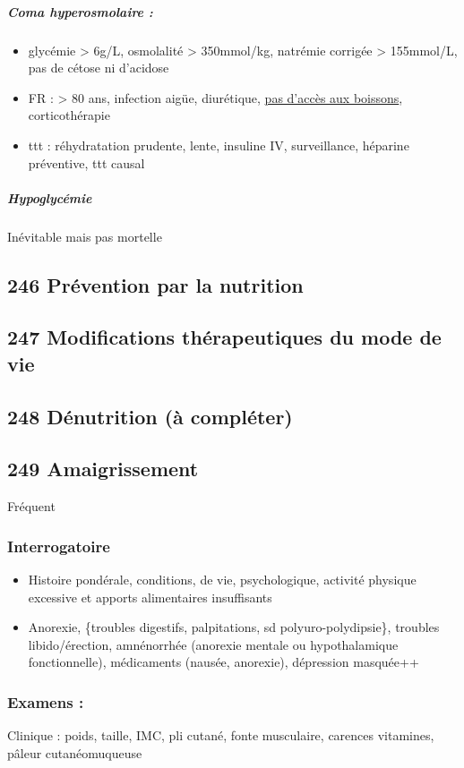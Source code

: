 \documentclass[11pt]{article}
\begin{document}
\subparagraph{Coma hyperosmolaire :}
\label{sec:org894731c}
\begin{itemize}
\item glycémie > 6g/L, osmolalité > 350mmol/kg, natrémie corrigée > 155mmol/L, pas
de cétose ni d'acidose
\item FR : > 80 ans, infection aigüe, diurétique, \uline{pas d'accès aux boissons}, corticothérapie
\item ttt : réhydratation prudente, lente, insuline IV, surveillance, héparine
préventive, ttt causal
\end{itemize}

\subparagraph{Hypoglycémie}
\label{sec:orge30bddb}
Inévitable  mais pas mortelle
\subsection{246 \textdagger{} Prévention par la nutrition}
\label{sec:org0ae2a98}
\subsection{247 \textdagger{} Modifications thérapeutiques du mode de vie}
\label{sec:org3e16552}
\subsection{248 \textdagger{} Dénutrition (à compléter)}
\label{sec:org10ca0eb}
\subsection{249 \textdagger{} Amaigrissement}
\label{sec:org9679070}
Fréquent

\subsubsection{Interrogatoire}
\label{sec:org46883ef}
\begin{itemize}
\item Histoire pondérale, conditions, de vie, psychologique, activité physique excessive et apports alimentaires insuffisants
\item Anorexie, \{troubles digestifs, palpitations, sd polyuro-polydipsie\}, troubles
libido/érection, amnénorrhée (anorexie mentale ou hypothalamique
fonctionnelle), médicaments (nausée, anorexie), dépression masquée++
\end{itemize}

\subsubsection{Examens :}
\label{sec:orga074cf4}
Clinique : poids, taille, IMC, pli cutané, fonte musculaire, carences vitamines,
pâleur cutanéomuqueuse
\end{document}

